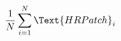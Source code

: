 \documentclass[preview]{standalone}
\begin{document}
\begin{align*}
\frac{1}{N}\sum_{i=1}^{N}{\Text{HR Patch}}_i
\end{align*}
\end{document}
